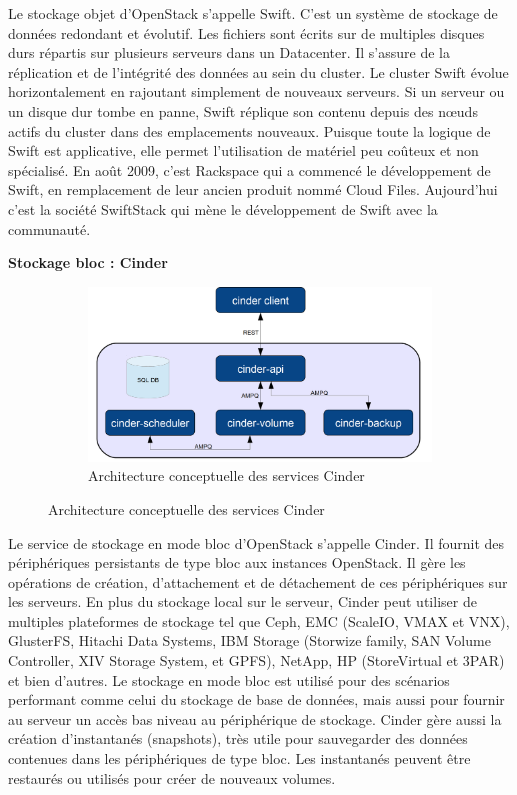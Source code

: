 \documentclass{article}
\begin{document}
Le stockage objet d'OpenStack s'appelle Swift. C'est un système de stockage de données redondant et évolutif. Les fichiers sont écrits sur de multiples disques durs répartis sur plusieurs serveurs dans un Datacenter. Il s'assure de la réplication et de l'intégrité des données au sein du cluster. Le cluster Swift évolue horizontalement en rajoutant simplement de nouveaux serveurs. Si un serveur ou un disque dur tombe en panne, Swift réplique son contenu depuis des nœuds actifs du cluster dans des emplacements nouveaux. Puisque toute la logique de Swift est applicative, elle permet l'utilisation de matériel peu coûteux et non spécialisé.
\newline
En août 2009, c'est Rackspace qui a commencé le développement de Swift, en remplacement de leur ancien produit nommé Cloud Files. Aujourd'hui c'est la société SwiftStack qui mène le développement de Swift avec la communauté.

\newpage
\textbf{Stockage bloc : Cinder}
\newline

\begin{figure}[h!]
	\centering
  	\begin{subfigure}[b]{1.0\linewidth}
	\includegraphics[width=\linewidth]{cinder.png}
	\caption{Architecture conceptuelle des services Cinder}
  	\end{subfigure}
\end{figure}

Le service de stockage en mode bloc d'OpenStack s'appelle Cinder. Il fournit des périphériques persistants de type bloc aux instances OpenStack. Il gère les opérations de création, d'attachement et de détachement de ces périphériques sur les serveurs. En plus du stockage local sur le serveur, Cinder peut utiliser de multiples plateformes de stockage tel que Ceph, EMC (ScaleIO, VMAX et VNX), GlusterFS, Hitachi Data Systems, IBM Storage (Storwize family, SAN Volume Controller, XIV Storage System, et GPFS), NetApp, HP (StoreVirtual et 3PAR) et bien d'autres.
\newline
Le stockage en mode bloc est utilisé pour des scénarios performant comme celui du stockage de base de données, mais aussi pour fournir au serveur un accès bas niveau au périphérique de stockage. Cinder gère aussi la création d'instantanés (snapshots), très utile pour sauvegarder des données contenues dans les périphériques de type bloc. Les instantanés peuvent être restaurés ou utilisés pour créer de nouveaux volumes.
\newpage
\end{document}
